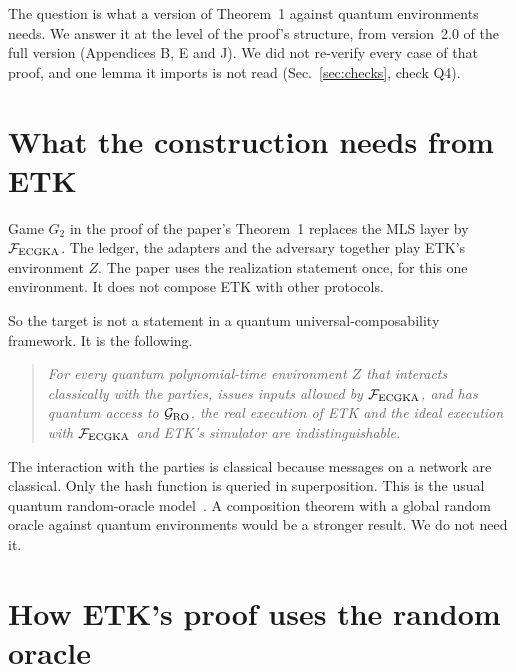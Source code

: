 \documentclass[aps,prx,reprint,superscriptaddress,nofootinbib,floatfix]{revtex4-2}
\theoremstyle{remark}
\newcommand{\F}{\mathcal F_{\rm ECGKA}}
\newcommand{\GRO}{\mathcal G_{\rm RO}}
\begin{document}
The question is what a version of Theorem~1 against quantum environments needs. We answer it at the level of the proof's structure, from version~2.0 of the full version (Appendices B, E and J). We did not re-verify every case of that proof, and one lemma it imports is not read (Sec.~\ref{sec:checks}, check Q4).

\section{What the construction needs from ETK}

Game $G_2$ in the proof of the paper's Theorem~1 replaces the MLS layer by $\F$. The ledger, the adapters and the adversary together play ETK's environment $Z$. The paper uses the realization statement once, for this one environment. It does not compose ETK with other protocols.

So the target is not a statement in a quantum universal-composability framework. It is the following.

\begin{quote}
\emph{For every quantum polynomial-time environment $Z$ that interacts classically with the parties, issues inputs allowed by $\F$, and has quantum access to $\GRO$, the real execution of ETK and the ideal execution with $\F$ and ETK's simulator are indistinguishable.}
\end{quote}

The interaction with the parties is classical because messages on a network are classical. Only the hash function is queried in superposition. This is the usual quantum random-oracle model~\cite{qrom}. A composition theorem with a global random oracle against quantum environments would be a stronger result. We do not need it.

\section{How ETK's proof uses the random oracle}
\end{document}

